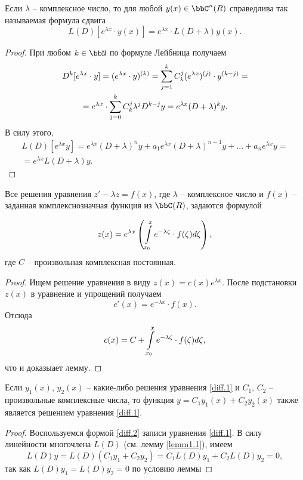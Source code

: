 \begin{lemm} \label{lemm1.2}
Если $\lambda$ -- комплексное число, то для любой $y(x)\in\bbC^n(R)$ справедлива так называемая формула сдвига
$$
L(D)\left[e^{\lambda x}\cdot y(x)\right]=e^{\lambda x}\cdot L(D+\lambda)y(x).
$$
\end{lemm}
\begin{proof}
При любом $k\in \bbN$ по формуле Лейбница получаем
\begin{multline*}
D^k[e^{\lambda x}\cdot y]=(e^{\lambda x}\cdot y)^{(k)}=\sum_{j=1}^{k}\limits C_k^j(e^{\lambda x})^{(j)}\cdot y^{(k-j)}=\\=e^{\lambda x}\cdot \sum_{j=0}^{k}\limits C_k^j\lambda^jD^{k-j}y=e^{\lambda x}(D+\lambda)^ky.
\end{multline*}
В силу этого,
\begin{multline*}
L(D)[e^{\lambda x}y]=e^{\lambda x}(D+\lambda)^ny+a_1e^{\lambda x}(D+\lambda)^{n-1}y+...+a_ne^{\lambda x}y=\\=e^{\lambda x}L(D+\lambda)y.
\end{multline*}
\end{proof}

\begin{lemm} \label{lemm1.3}
Все решения уравнения $z'-\lambda z = f(x)$, где $\lambda$ -- комплексное число и $f(x)$ -- заданная комплекснозначная функция из $\bbC(R)$, задаются формулой

$$
z(x)=e^{\lambda x}\left(\int_{x_0}^{x}\limits e^{-\lambda\zeta}\cdot f(\zeta)d\zeta\right),
$$
где $C$ -- произвольная комплексная постоянная. 
\end{lemm}

\begin{proof}
Ищем решение уравнения в виду $z(x)=c(x)e^{\lambda x}$. После подстановки $z(x)$ в уравнение и упрощений получаем 
$$
c'(x)=e^{-\lambda x}\cdot f(x).
$$
Отсюда
$$
c(x)=C+\int_{x_0}^{x}\limits e^{-\lambda\zeta}\cdot f(\zeta)d\zeta,
$$
что и доказыает лемму.
\end{proof}



\begin{lemm} \label{lemm2.1}
Если $y_1(x)$, $y_2(x)$ -- какие-либо решения уравнения \eqref{diff.1}  и $C_1$, $C_2$ -- произвольные комплексные числа, то функция $y=C_1y_1(x)+C_2y_2(x)$ также является решением уравнения \eqref{diff.1}.
\end{lemm}

\begin{proof}
Воспользуемся формой \eqref{diff.2} записи уравнения \eqref{diff.1}. В силу линейности многочлена $L(D)$ (см. лемму \ref{lemm1.1}), имеем
$$
L(D)y=L(D)(C_1y_1+C_2y_2)=C_1L(D)y_1+C_2L(D)y_2=0,
$$
так как $L(D)y_1=L(D)y_2=0$ по условию леммы
\end{proof}

